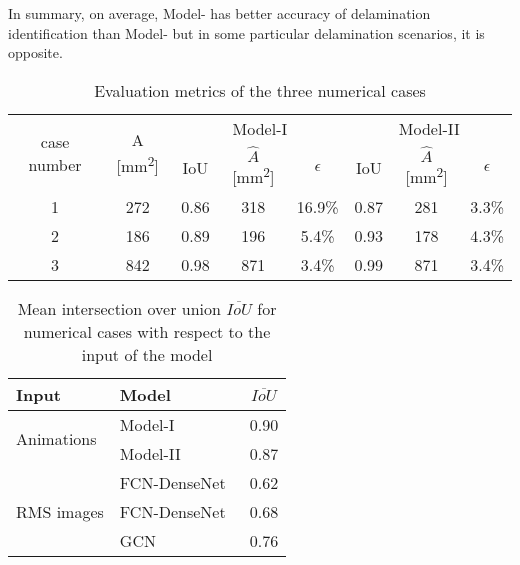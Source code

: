 In summary, on average, Model- has better accuracy of delamination 
identification than Model- but in some particular delamination 
scenarios, it is opposite.
\begin{table}[]
\small\sf\centering
	\caption{Evaluation metrics of the three numerical cases}
	\begin{tabular}{cccccccc}
		\toprule
		\multirow{2}{*}{case number} & \multicolumn{1}{c}{\multirow{2}{*}{A [mm\textsuperscript{2}]}} & \multicolumn{3}{c}{Model-I} & \multicolumn{3}{c}{Model-II} \\ \cmidrule(lr){3-5} \cmidrule(lr){6-8} 
		& \multicolumn{1}{c}{}  & \multicolumn{1}{c}{IoU}  & \multicolumn{1}{c}{\(\hat{A}\) [mm\textsuperscript{2}]} & \(\epsilon\) & \multicolumn{1}{c}{IoU}  & \multicolumn{1}{c}{\(\hat{A}\) [mm\textsuperscript{2}]} & \(\epsilon\) \\ 
		\midrule
		1 & 272 & \multicolumn{1}{c}{0.86} & \multicolumn{1}{c}{318} & 16.9\% & \multicolumn{1}{c}{0.87} & \multicolumn{1}{c}{281} & 3.3\% \\ 
		2 &  186  & \multicolumn{1}{c}{0.89} & \multicolumn{1}{c}{196} & 5.4\% & \multicolumn{1}{c}{0.93} & \multicolumn{1}{c}{178} & 4.3\% \\ 
		3 & 842 & \multicolumn{1}{c}{0.98} &\multicolumn{1}{c}{871} & 3.4\%   & \multicolumn{1}{c}{0.99} & \multicolumn{1}{c}{871} & 3.4\% \\ 
		\bottomrule
	\end{tabular}	
	\label{tab:num_cases}
\end{table}
\begin{table}[]
\small\sf\centering
	\caption{Mean intersection over union \(\overline{IoU}\) for numerical cases with respect to the input of the model}
	\begin{tabular}{llc}
		\toprule
		Input & Model & \(\overline{IoU}\) \\ 
		\midrule
		\multirow{2}{*}{Animations} & Model-I & 0.90 \\ & Model-II                    & 0.87     \\ \midrule
		\multirow{3}{*}{RMS images}  & FCN-DenseNet~\cite{Ijjeh2021} & 0.62     \\
		& FCN-DenseNet~\cite{Ijjeh2022} & 0.68     \\
		& GCN~\cite{Ijjeh2022}          & 0.76     \\ 
		\bottomrule
	\end{tabular}
	\label{tab:meanIoU_vs_input}
\end{table}
